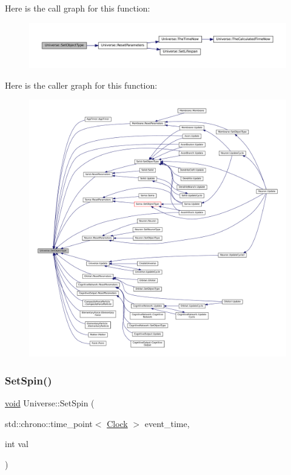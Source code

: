 Here is the call graph for this function\+:\nopagebreak
\begin{figure}[H]
\begin{center}
\leavevmode
\includegraphics[width=350pt]{class_universe_a2274a54fbdc7504c897e4272162bf17a_cgraph}
\end{center}
\end{figure}
Here is the caller graph for this function\+:\nopagebreak
\begin{figure}[H]
\begin{center}
\leavevmode
\includegraphics[width=350pt]{class_universe_a2274a54fbdc7504c897e4272162bf17a_icgraph}
\end{center}
\end{figure}
\mbox{\label{class_universe_ae2ae1c3b3e4cde2c18f5f6a814761ec8}} 
\subsubsection{\texorpdfstring{Set\+Spin()}{SetSpin()}}
{\footnotesize\ttfamily \mbox{\hyperlink{glad_8h_a950fc91edb4504f62f1c577bf4727c29}{void}} Universe\+::\+Set\+Spin (\begin{DoxyParamCaption}\item[{std\+::chrono\+::time\+\_\+point$<$ \mbox{\hyperlink{universe_8h_a0ef8d951d1ca5ab3cfaf7ab4c7a6fd80}{Clock}} $>$}]{event\+\_\+time,  }\item[{int}]{val }\end{DoxyParamCaption})\hspace{0.3cm}{\ttfamily [virtual]}}



